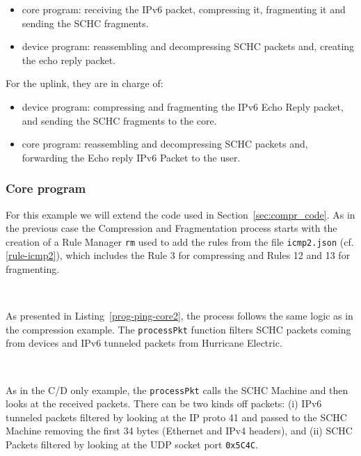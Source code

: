 \begin{itemize}
\item core program: receiving the IPv6 packet, compressing it, fragmenting it and sending the SCHC fragments.
\item device program: reassembling and decompressing SCHC packets and, creating the echo reply packet.
\end{itemize} 

For the uplink, they are in charge of: 

\begin{itemize}
\item device program: compressing and fragmenting the IPv6 Echo Reply packet, and sending the SCHC fragments to the core.
\item core program: reassembling and decompressing SCHC packets and, forwarding the Echo reply IPv6 Packet to the user.
\end{itemize} 


\subsubsection{Core program}

For this example we will extend the code used in Section~\ref{sec:compr_code}. 
As in the previous case the Compression and Fragmentation process starts with the creation of a Rule Manager \texttt{rm} used to add the rules from the file \texttt{icmp2.json} (cf. \vref{rule-icmp2}), which includes the Rule 3 for compressing and Rules 12 and 13 for fragmenting.

~

As presented in Listing~\vref{prog-ping-core2}, the process follows the same logic as in the compression example. 
The \texttt{processPkt} function filters SCHC packets coming from devices and IPv6 tunneled packets from Hurricane Electric. 

~

As in the C/D only example, the \texttt{processPkt} calls the SCHC Machine and then looks at the received packets. 
There can be two kinds off packets: (i) IPv6 tunneled packets filtered by looking at the IP proto 41 and passed to the SCHC Machine removing the first 34 bytes (Ethernet and IPv4 headers), and (ii) SCHC Packets filtered by looking at the UDP socket port \texttt{0x5C4C}.

~

